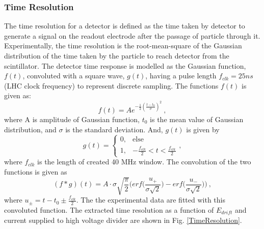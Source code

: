 \subsubsection{Time Resolution}
The time resolution for a detector is defined as the time taken by detector to generate a signal on the readout electrode after the passage of particle through it.
Experimentally, the time resolution is the root-mean-square of the Gaussian distribution of the time taken by the particle to reach detector from the scintillator.
The detector time response is modelled as the Gaussian function, $f(t)$, convoluted with a square wave, $g(t)$, having a pulse length $f_{clk}=25ns$ (LHC clock frequency) to represent discrete sampling. 
The functions $f(t)$ is given as:
\begin{equation}
f(t) = Ae^{-\frac{1}{2}(\frac{t-t_0}{\sigma})^2}~,
\end{equation}
where A is amplitude of Gaussian function, $t_0$  is the mean value of Gaussian distribution, and $\sigma$ is the standard deviation. And, $g(t)$ is given by
\begin{equation}
g(t) =
      \begin{cases}
              0, & \text{else} \\
              1, & \text{$-\frac{f_{clk}}{2}<t<\frac{f_{clk}}{2}$}
      \end{cases},
\end{equation}
where $f_{clk}$ is the length of created 40 MHz window.
The convolution of the two functions is given as
\begin{equation}
(f*g)(t) = A \cdot \sigma \sqrt{\frac{\pi}{2}}\Big(erf\Big(\frac{u_{+}}{\sigma\sqrt{2}}\Big)-erf\Big(\frac{u_{-}}{\sigma\sqrt{2}}\Big)\Big)~,
\end{equation}
where $u_{\pm}= t-t_0\pm\frac{f_{clk}}{2}$. 
The the experimental data are fitted with this convoluted function.
The extracted time resolution as a function of $E_{drift}$ and current supplied to high voltage divider are shown in Fig. \ref{TimeResolution}. 
